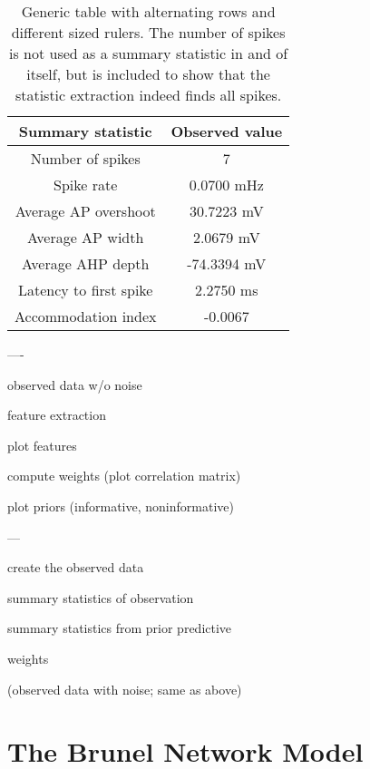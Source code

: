 \begin{table}[H]
  \caption{Generic table with alternating rows and different sized rulers. The number of spikes is not used as a summary statistic in and of itself, but is included to show that the statistic extraction indeed finds all spikes.}
  \begin{center}
    \begin{tabular}{cc}
      \toprule
      \textbf{Summary statistic} & \textbf{Observed value} \\
      \midrule
      Number of spikes &  7 \\
      Spike rate &  0.0700 mHz \\
      Average AP overshoot & 30.7223 mV  \\
      Average AP width & 2.0679 mV \\
      Average AHP depth & -74.3394 mV \\
      Latency to first spike & 2.2750 ms \\
      Accommodation index &  -0.0067 \\
      \bottomrule
    \end{tabular}
  \end{center}
  \label{tab:hh_noisy_sumstats}
\end{table}



----

observed data w/o noise 

feature extraction 

plot features 

compute weights (plot correlation matrix) 

plot priors (informative, noninformative)


---

create the observed data

summary statistics of observation 

summary statistics from prior predictive

weights

(observed data with noise; same as above)

\section{The Brunel Network Model}

